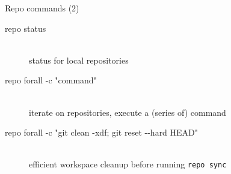 \begin{frame}{Repo commands (2)}
  \begin{description}
    \item[repo status] \hfill \\
      status for local repositories
    \item[repo forall -c "command"] \hfill \\
      iterate on repositories, execute a (series of) command
    \item[repo forall -c "git clean -xdf; git reset -{}-hard HEAD"] \hfill \\
      efficient workspace cleanup before running \texttt{repo sync}
  \end{description}
\end{frame}
